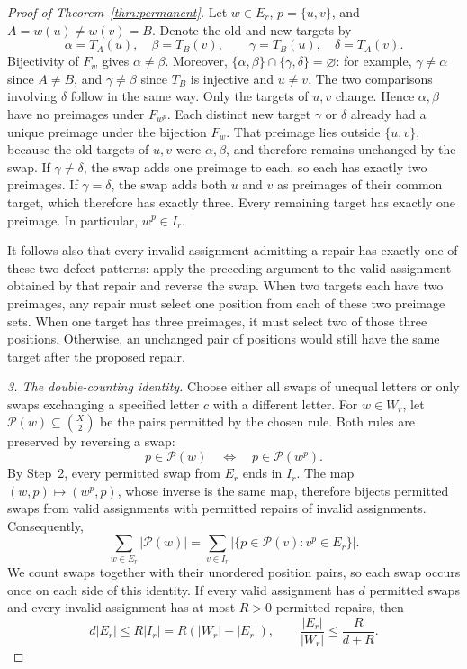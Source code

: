 \documentclass[10pt,a4paper]{amsart}
\begin{document}
\begin{proof}[Proof of Theorem~\ref{thm:permanent}]
Let \(w\in E_r\), \(p=\{u,v\}\), and
\(A=w(u)\ne w(v)=B\). Denote the old and new targets by
\begin{equation}
 \alpha=T_A(u),\quad \beta=T_B(v),\qquad
 \gamma=T_B(u),\quad \delta=T_A(v).
\end{equation}
Bijectivity of \(F_w\) gives \(\alpha\ne\beta\).
Moreover,
\(\{\alpha,\beta\}\cap\{\gamma,\delta\}=\varnothing\):
for example, \(\gamma\ne\alpha\) since \(A\ne B\), and
\(\gamma\ne\beta\) since \(T_B\) is injective and \(u\ne v\).
The two comparisons involving \(\delta\) follow in the same way.
Only the targets of \(u,v\) change. Hence \(\alpha,\beta\)
have no preimages under \(F_{w^p}\). Each distinct new target
\(\gamma\) or \(\delta\) already had a unique preimage under
the bijection \(F_w\). That preimage lies outside \(\{u,v\}\),
because the old targets of \(u,v\) were \(\alpha,\beta\), and
therefore remains unchanged by the swap.
If \(\gamma\ne\delta\), the swap adds one preimage to each,
so each has exactly two preimages. If \(\gamma=\delta\), the swap
adds both \(u\) and \(v\) as preimages of their common target,
which therefore has exactly three.
Every remaining target has exactly one preimage. In particular,
\(w^p\in I_r\).

It follows also that every invalid assignment admitting a repair
has exactly one of these two defect patterns: apply the preceding
argument to the valid assignment obtained by that repair and reverse
the swap. When two targets each have two preimages, any repair must
select one position from each of these two preimage sets. When one
target has three preimages, it must select two of those three
positions. Otherwise, an unchanged pair of positions would still
have the same target after the proposed repair.

\emph{3. The double-counting identity.}
Choose either all swaps of unequal letters or only swaps exchanging
a specified letter \(c\) with a different letter. For \(w\in W_r\),
let \(\mathcal P(w)\subseteq\binom X2\) be the pairs permitted
by the chosen rule. Both rules are preserved by reversing a swap:
\begin{equation}
 p\in\mathcal P(w)\quad\Longleftrightarrow\quad
 p\in\mathcal P(w^p).
\end{equation}
By Step~2, every permitted swap from \(E_r\) ends in \(I_r\).
The map \((w,p)\mapsto(w^p,p)\), whose inverse is the same map,
therefore bijects permitted swaps from valid assignments with
permitted repairs of invalid assignments. Consequently,
\begin{equation}\label{eq:switching-count}
 \sum_{w\in E_r}|\mathcal P(w)|
 =\sum_{v\in I_r}
   |\{p\in\mathcal P(v):v^p\in E_r\}|.
\end{equation}
We count swaps together with their unordered position pairs, so each
swap occurs once on each side of this identity. If every valid
assignment has \(d\) permitted swaps and every invalid assignment
has at most \(R>0\) permitted repairs, then
\begin{equation}\label{eq:switching-density}
 d|E_r|\leq R|I_r|=R(|W_r|-|E_r|),\qquad
 \frac{|E_r|}{|W_r|}\leq\frac{R}{d+R}.
\end{equation}


\end{proof}
\end{document}
